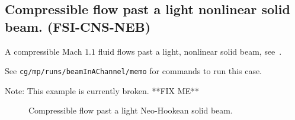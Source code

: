 \subsection{Compressible flow past a light nonlinear solid beam. (FSI-CNS-NEB)} \label{sec:compressibleFlowPastSolidBeam}


A compressible Mach $1.1$ fluid flows past a light, nonlinear solid beam, see~\cite{flunsi2016}.

\mni
See {\tt cg/mp/runs/beamInAChannel/memo} for commands to run this case.

\mni
{\red Note:} This example is currently broken. **FIX ME**
 


{
\newcommand{\figSize}{5cm}
\newcommand{\cxa}{.0}
\newcommand{\cxb}{.0}
\newcommand{\cya}{.0}
\newcommand{\cyb}{.0}

\begin{figure}[htb]
\begin{center}
\end{center}
\caption{Compressible flow past a light Neo-Hookean solid beam.}
\label{fig:compressibleFlowPastBeam}
\end{figure}
}